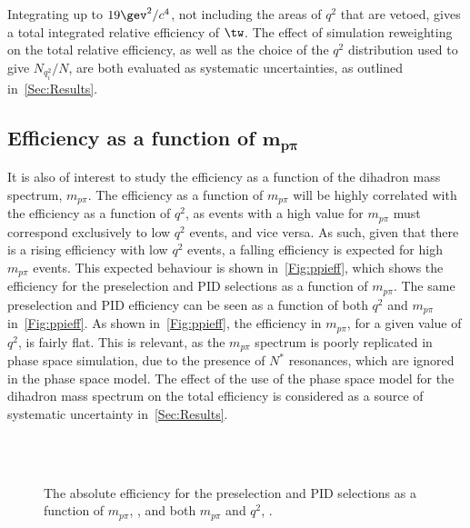 Integrating up to $19 \gev^{2}/c^{4}$, not including the areas of $q^{2}$ that are vetoed, gives a total integrated relative efficiency of $\tw$. The effect of simulation reweighting  on the total relative efficiency, as well as the choice of the $q^{2}$ distribution used to give $N_{q^{2}_{i}}/N$, are both evaluated as systematic uncertainties, as outlined in~\autoref{Sec:Results}. 
\subsection[Efficiency as a function of $m_{p\pi}$]{Efficiency as a function of $\mathbold{m_{p\pi}}$}

It is also of interest to study the efficiency as a function of the dihadron mass spectrum, $m_{p\pi}$. The efficiency as a function of $m_{p\pi}$ will be highly correlated with the efficiency as a function of $q^{2}$, as events with a high value for $m_{p\pi}$ must correspond exclusively to low $q^{2}$ events, and vice versa. As such, given that there is a rising efficiency with low $q^{2}$ events, a falling efficiency is expected for high $m_{p\pi}$ events.
This expected behaviour is shown in~\autoref{Fig:ppieff}\protect{}, which shows the efficiency for the preselection and PID selections as a function of $m_{p\pi}$. The same preselection and PID efficiency can be seen as a function of both $q^{2}$ and $m_{p\pi}$ in~\autoref{Fig:ppieff}\protect{}. As shown in~\autoref{Fig:ppieff}\protect{}, the efficiency in $m_{p\pi}$, for a given value of $q^{2}$, is fairly flat. This is relevant, as the $m_{p\pi}$ spectrum is poorly replicated in phase space simulation, due to the presence of $N^{*}$ resonances, which are ignored in the phase space model. The effect of the use of the phase space model for the dihadron mass spectrum on the total efficiency is considered as a source of systematic uncertainty in~\autoref{Sec:Results}.
\begin{figure}[!t]\def\nh{0.3\textwidth}
  \centering
  \\
  \hspace*{1cm}
  \\

  \caption{ The absolute efficiency for the preselection and PID selections as a function of $m_{p\pi}$, \protect{}, and both $m_{p\pi}$ and $q^{2}$, \protect{}.}
\label{Fig:ppieff}

\end{figure}


 
